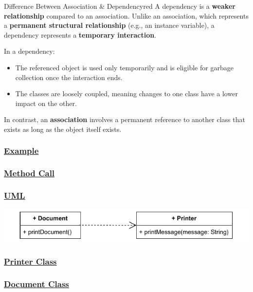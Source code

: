 \begin{prettyBox}{Difference Between Association \& Dependency}{red}
A dependency is a \textbf{weaker relationship} compared to an association. Unlike an association, which represents a \textbf{permanent structural relationship} (e.g., an instance variable), a dependency represents a \textbf{temporary interaction}. 

In a dependency:
\begin{itemize}
    \item The referenced object is used only temporarily and is eligible for garbage collection once the interaction ends.
    \item The classes are loosely coupled, meaning changes to one class have a lower impact on the other.
\end{itemize}

In contrast, an \textbf{association} involves a permanent reference to another class that exists as long as the object itself exists.
\end{prettyBox}

\subsubsection*{\underline{Example}}

\subsubsection*{\underline{Method Call}}

\subsubsection*{\underline{UML}}
\includegraphics[width=\textwidth]{Chapters/Diagram/OOP/EX3/ex3.a.drawio.pdf}


\subsubsection*{\underline{Printer Class}}


\subsubsection*{\underline{Document Class}}



